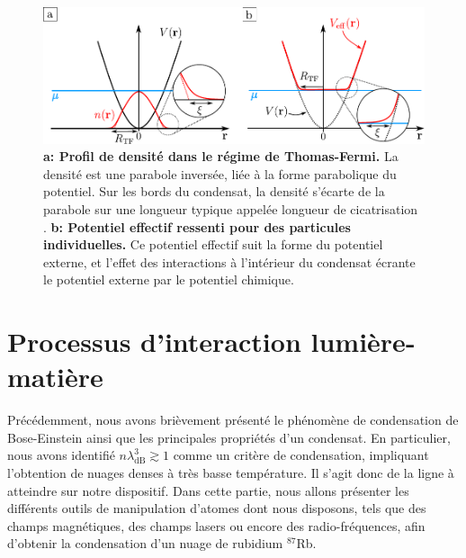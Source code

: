 \begin{figure}
\centering
\includegraphics[width=\textwidth]{Fig/BEC_manip/thomas_fermi.pdf}
\caption{\textbf{a: Profil de densité dans le régime de Thomas-Fermi.} La densité est une parabole inversée, liée à la forme parabolique du potentiel. Sur les bords du condensat, la densité s'écarte de la parabole sur une longueur typique appelée longueur de cicatrisation \protect\footnotemark. \textbf{b: Potentiel effectif ressenti pour des particules individuelles.} Ce potentiel effectif suit la forme du potentiel externe, et l'effet des interactions à l'intérieur du condensat écrante le potentiel externe par le potentiel chimique.}
\label{fig:thomas_fermi}
\end{figure}








\section{Processus d'interaction lumière-matière}
Précédemment, nous avons brièvement présenté le phénomène de condensation de Bose-Einstein ainsi que les principales propriétés d'un condensat. En particulier, nous avons identifié $n \lambda_{\mathrm{dB}}^3 \gtrsim 1$ comme un critère de condensation, impliquant l'obtention de nuages denses à très basse température. Il s'agit donc de la ligne à atteindre sur notre dispositif. Dans cette partie, nous allons présenter les différents outils de manipulation d'atomes dont nous disposons, tels que des champs magnétiques, des champs lasers ou encore des radio-fréquences, afin d'obtenir la condensation d'un nuage de rubidium ${}^{87}$Rb.
